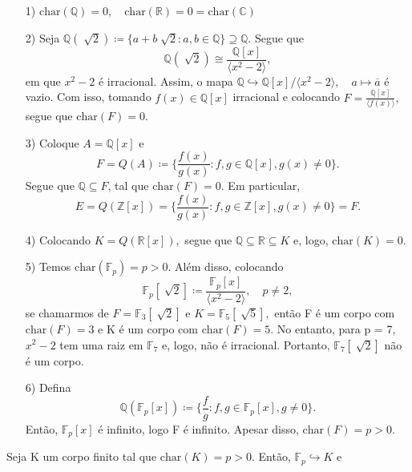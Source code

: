 \documentclass[algebraII_notes.tex]{subfiles}
\begin{document}
\begin{example}
	\begin{itemize}
		\item[1)] \(\mathrm{char}(\mathbb{Q}) = 0,\quad \mathrm{char}(\mathbb{R})=0 = \mathrm{char}(\mathbb{C})\)
		\item[2)] Seja \(\mathbb{Q}(\sqrt[]{2})\coloneqq \{a + b\sqrt[]{2}: a, b\in \mathbb{Q}\}\supseteq{\mathbb{Q}}.\) Segue que
		      \[
			      \mathbb{Q}(\sqrt[]{2})\cong{\frac{\mathbb{Q}[x]}{\langle x^{2}-2 \rangle}},
		      \]
		      em que \(x^{2}-2\) é irracional. Assim, o mapa \(\mathbb{Q}\hookrightarrow \mathbb{Q}[x]/\langle x^{2}-2 \rangle,\quad a\mapsto \overline{a}\) é vazio.
		      Com isso, tomando \(f(x)\in \mathbb{Q}[x]\) irracional e colocando \(F = \frac{\mathbb{Q}[x]}{\langle f(x) \rangle},\)
		      segue que \(\mathrm{char}(F) = 0.\)
		\item[3)] Coloque \(A = \mathbb{Q}[x]\) e
		      \[
			      F = Q(A)\coloneqq \biggl\{\frac{f(x)}{g(x)}: f, g\in \mathbb{Q}[x], g(x)\neq0\biggr\}.
		      \]
		      Segue que \(\mathbb{Q}\subseteq{F}\), tal que \(\mathrm{char}(F) = 0\). Em particular,
		      \[
			      E = Q(\mathbb{Z}[x]) = \biggl\{\frac{f(x)}{g(x)}:f, g\in \mathbb{Z}[x], g(x)\neq0\biggr\} = F.
		      \]
		\item[4)] Colocando \(K = Q(\mathbb{R}[x]),\) segue que \(\mathbb{Q} \subseteq{\mathbb{R}}\subseteq{K}\) e, logo, \(\mathrm{char}(K) = 0.\)
		\item[5)] Temos \(\mathrm{char}(\mathbb{F}_{p}) = p > 0.\) Além disso, colocando
		      \[
			      \mathbb{F}_{p}[\sqrt[]{2}]\coloneqq \frac{\mathbb{F}_{p}[x]}{\langle x^{2}-2 \rangle},\quad p\neq2,
		      \]
		      se chamarmos de \(F = \mathbb{F}_{3}[\sqrt[]{2}]\) e \(K = \mathbb{F}_{5}[\sqrt[]{5}],\) então
		      F é um corpo com \(\mathrm{char}(F) = 3\) e K é um corpo com \(\mathrm{char}(F) = 5.\) No entanto, para p = 7,
		      \(x^{2}-2\) tem uma raiz em \(\mathbb{F}_{7}\) e, logo, não é irracional. Portanto, \(\mathbb{F}_{7}[\sqrt[]{2}]\) não é um
		      corpo.
		\item[6)] Defina
		      \[
			      \mathbb{Q}(\mathbb{F}_{p}[x])\coloneqq \biggl\{\frac{f}{g}: f, g\in \mathbb{F}_{p}[x], g\neq 0\biggr\}.
		      \]
		      Então, \(\mathbb{F}_{p}[x]\) é infinito, logo F é infinito. Apesar disso, \(\mathrm{char}(F) = p > 0.\)
	\end{itemize}
\end{example}
Seja K um corpo finito tal que \(\mathrm{char}(K) = p > 0.\) Então, \(\mathbb{F}_{p}\hookrightarrow K\) e
\end{document}
